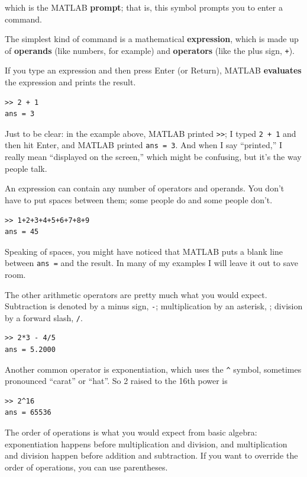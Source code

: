 \documentclass[
]{book}
\begin{document}
which is the MATLAB {\bf prompt}; that is, this symbol prompts you
to enter a command.

The simplest kind of command is a mathematical {\bf expression}, which
is made up of {\bf operands} (like numbers, for example) and
{\bf operators} (like the plus sign, {\tt +}).

If you type an expression and then press Enter (or Return), MATLAB
{\bf evaluates} the expression and prints the result.

\begin{verbatim}
>> 2 + 1
ans = 3
\end{verbatim}

Just to be clear: in the example above, MATLAB printed {\tt >>}; I
typed {\tt 2 + 1} and then hit Enter, and MATLAB printed {\tt ans = 3}.
And when I say ``printed,'' I really mean ``displayed on the screen,''
which might be confusing, but it's the way people talk.

An expression can contain any number of operators and operands.  You
don't have to put spaces between them; some people do and some people
don't.

\begin{verbatim}
>> 1+2+3+4+5+6+7+8+9
ans = 45
\end{verbatim}

Speaking of spaces, you might have noticed that MATLAB puts a blank
line between {\tt ans =} and the result.  In many of my examples I will leave
it out to save room.

The other arithmetic operators are pretty much what you would expect.
Subtraction is denoted by a minus sign, {\tt -}; multiplication by
an asterisk, {\tt *}; division by a forward slash, {\tt /}.

\begin{verbatim}
>> 2*3 - 4/5
ans = 5.2000
\end{verbatim}

Another common operator is exponentiation, which uses the \verb+^+
symbol, sometimes pronounced ``carat'' or ``hat''.  So 2 raised to the
16th power is

\begin{verbatim}
>> 2^16
ans = 65536
\end{verbatim}

The order of operations is what you would expect from basic algebra:
exponentiation happens before multiplication
and division, and
multiplication and division happen before addition and subtraction.
If you want to override the order of operations, you can use parentheses.
\end{document}
